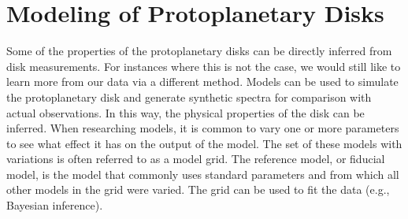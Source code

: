 \documentclass[oneside, single, authoryear, semicolon, 12pt]{lion-msc}
\newcommand{\4}{$_4$}
\newcommand{\3}{$_3$}
\newcommand{\2}{$_2$}
\begin{document}
\section{Modeling of Protoplanetary Disks}
Some of the properties of the protoplanetary disks can be directly inferred from disk measurements. For instances where this is not the case, we would still like to learn more from our data via a different method. Models can be used to simulate the protoplanetary disk and generate synthetic spectra for comparison with actual observations. In this way, the physical properties of the disk can be inferred.
When researching models, it is common to vary one or more parameters to see what effect it has on the output of the model. The set of these models with variations is often referred to as a model grid. The reference model, or fiducial model, is the model that commonly uses standard parameters and from which all other models in the grid were varied. The grid can be used to fit the data (e.g., Bayesian inference).
\end{document}

